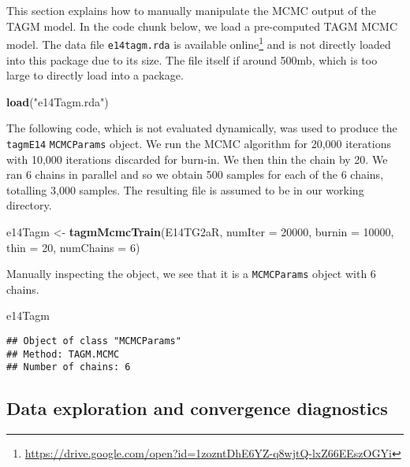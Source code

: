 \documentclass[]{article}
\newenvironment{Shaded}{\begin{snugshade}}{\end{snugshade}}
\newcommand{\KeywordTok}[1]{\textcolor[rgb]{0.13,0.29,0.53}{\textbf{{#1}}}}
\newcommand{\DataTypeTok}[1]{\textcolor[rgb]{0.13,0.29,0.53}{{#1}}}
\newcommand{\DecValTok}[1]{\textcolor[rgb]{0.00,0.00,0.81}{{#1}}}
\newcommand{\StringTok}[1]{\textcolor[rgb]{0.31,0.60,0.02}{{#1}}}
\newcommand{\NormalTok}[1]{{#1}}
\let\rmarkdownfootnote\footnote%
\def\footnote{\protect\rmarkdownfootnote}
\begin{document}
This section explains how to manually manipulate the MCMC output of the
TAGM model. In the code chunk below, we load a pre-computed TAGM MCMC
model. The data file \texttt{e14tagm.rda} is available online\footnote{\url{https://drive.google.com/open?id=1zozntDhE6YZ-q8wjtQ-lxZ66EEszOGYi}}
and is not directly loaded into this package due to its size. The file
itself if around 500mb, which is too large to directly load into a
package.

\begin{Shaded}
\begin{Highlighting}[]
\KeywordTok{load}\NormalTok{(}\StringTok{"e14Tagm.rda"}\NormalTok{)}
\end{Highlighting}
\end{Shaded}

The following code, which is not evaluated dynamically, was used to
produce the \texttt{tagmE14} \texttt{MCMCParams} object. We run the MCMC
algorithm for 20,000 iterations with 10,000 iterations discarded for
burn-in. We then thin the chain by 20. We ran 6 chains in parallel and
so we obtain 500 samples for each of the 6 chains, totalling 3,000
samples. The resulting file is assumed to be in our working directory.

\begin{Shaded}
\begin{Highlighting}[]
\NormalTok{e14Tagm <-}\StringTok{ }\KeywordTok{tagmMcmcTrain}\NormalTok{(E14TG2aR,}
                         \DataTypeTok{numIter =} \DecValTok{20000}\NormalTok{,}
                         \DataTypeTok{burnin =} \DecValTok{10000}\NormalTok{,}
                         \DataTypeTok{thin =} \DecValTok{20}\NormalTok{,}
                         \DataTypeTok{numChains =} \DecValTok{6}\NormalTok{)}
\end{Highlighting}
\end{Shaded}

Manually inspecting the object, we see that it is a \texttt{MCMCParams}
object with 6 chains.

\begin{Shaded}
\begin{Highlighting}[]
\NormalTok{e14Tagm}
\end{Highlighting}
\end{Shaded}

\begin{verbatim}
## Object of class "MCMCParams"
## Method: TAGM.MCMC 
## Number of chains: 6
\end{verbatim}

\subsection{Data exploration and convergence
diagnostics}\label{data-exploration-and-convergence-diagnostics}
\end{document}
